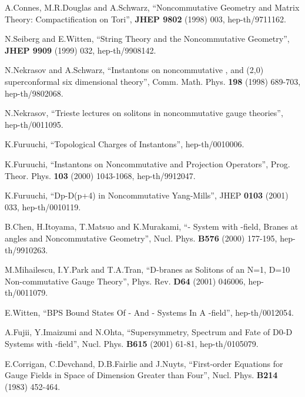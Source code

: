 \documentclass[a4paper,12pt]{article}
\begin{document}
\begin{thebibliography}{999}

A.Connes, M.R.Douglas and A.Schwarz, ``Noncommutative Geometry and Matrix
 Theory: Compactification on Tori'', \textbf{JHEP 9802} (1998) 003, 
hep-th/9711162.

N.Seiberg and E.Witten, ``String Theory and the Noncommutative Geometry'',
 \textbf{JHEP 9909} (1999) 032, hep-th/9908142.

N.Nekrasov and A.Schwarz, ``Instantons on noncommutative \coordHE{}, and
 (2,0) superconformal six dimensional theory'', Comm. Math. Phys. \textbf{198}
 (1998) 689-703, hep-th/9802068.

N.Nekrasov, ``Trieste lectures on solitons in noncommutative gauge theories'',
 hep-th/0011095.

K.Furuuchi, ``Topological Charges of \coordHE{} Instantons'', hep-th/0010006.

K.Furuuchi, ``Instantons on Noncommutative \coordHE{} and Projection 
Operators'', Prog. Theor. Phys. \textbf{103} (2000) 1043-1068, hep-th/9912047.

K.Furuuchi, ``Dp-D(p+4) in Noncommutative Yang-Mills'', 
JHEP \textbf{0103} (2001) 033, hep-th/0010119.

B.Chen, H.Itoyama, T.Matsuo and K.Murakami, ``\coordHE{}-\coordHE{} System with \coordHE{}-field,
 Branes at angles and Noncommutative Geometry'', Nucl. Phys. \textbf{B576}
 (2000) 177-195, hep-th/9910263.

M.Mihailescu, I.Y.Park and T.A.Tran, 
``D-branes as Solitons of an N=1, D=10 Non-commutative Gauge Theory'', 
Phys. Rev. \textbf{D64} (2001) 046006, hep-th/0011079.

E.Witten, ``BPS Bound States Of \coordHE{}-\coordHE{} And \coordHE{}-\coordHE{} Systems 
In A \coordHE{}-field'',
 hep-th/0012054.

A.Fujii, Y.Imaizumi and N.Ohta, ``Supersymmetry, Spectrum and Fate of D0-D\coordHE{} 
Systems with \coordHE{}-field'', Nucl. Phys. \textbf{B615} (2001) 61-81, 
hep-th/0105079.

E.Corrigan, C.Devchand, D.B.Fairlie and J.Nuyts, ``First-order Equations for
 Gauge Fields in Space of Dimension Greater than Four'', Nucl. Phys.
 \textbf{B214} (1983) 452-464.


\end{thebibliography}
\end{document}
